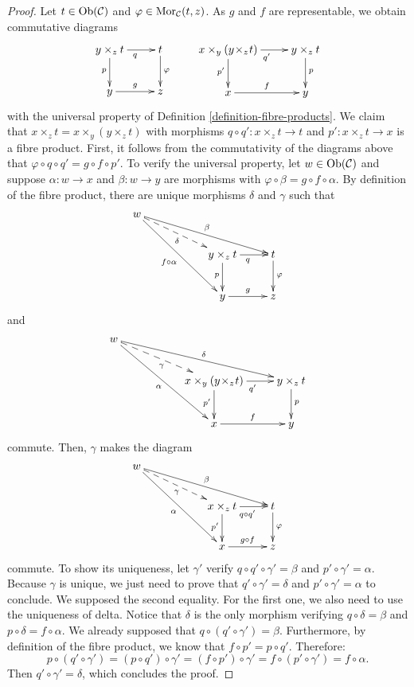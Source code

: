 \begin{proof}
Let $t \in \mathop{\mathrm{Ob}}\nolimits(\mathcal C)$ and $ \varphi \in \mathop{\mathrm{Mor}}\nolimits_{\mathcal C}(t,z) $.
As $g$ and $f$ are representable, we obtain commutative diagrams
$$
\xymatrix{
y \times_z t \ar[r]_q \ar[d]_p &
t \ar[d]^{\varphi} \\
y \ar[r]^{g} & z
}
\quad\quad
\xymatrix{
x \times_y (y\! \times_z\! t) \ar[r]_{q'} \ar[d]_{p'} &
y \times_z t \ar[d]^p \\
x \ar[r]^f & y
}
$$
with the universal property of Definition \ref{definition-fibre-products}.
We claim that $x \times_z t = x \times_y (y \times_z t)$
with morphisms $q \circ q' : x \times_z t \to t$ and $p' : x \times_z t \to x$
is a fibre product. First, it follows from the commutativity of the
diagrams above that $\varphi \circ q \circ q' = g \circ f \circ p'$.
To verify the universal property, let
$w \in \mathop{\mathrm{Ob}}\nolimits(\mathcal C)$ and suppose $\alpha : w \to x$ and
$\beta : w \to y$ are morphisms with
$\varphi \circ \beta = g \circ f \circ \alpha$.
By definition of the fibre product, there
are unique morphisms $\delta$ and $\gamma$ such that
$$
\xymatrix{
w \ar[rrrd]^\beta \ar@{-->}[rrd]_\delta \ar[rrdd]_{f\circ\alpha} & & \\
& & y \times_z t \ar[d]_p \ar[r]_q & t \ar[d]^{\varphi} \\
& & y \ar[r]^{g} & z
}
$$
and
$$
\xymatrix{
w \ar[rrrd]^\delta \ar@{-->}[rrd]_\gamma \ar[rrdd]_{\alpha} & & \\
& & x \times_y (y\!\times_z\! t) \ar[d]_{p'} \ar[r]_{q'} &
y \times_z t \ar[d]^{p} \\
& & x \ar[r]^{f} & y
}
$$
commute. Then, $\gamma$ makes the diagram
$$
\xymatrix{
w \ar[rrrd]^\beta \ar@{-->}[rrd]_\gamma \ar[rrdd]_{\alpha} & & \\
& & x \times_z t \ar[d]_{p'} \ar[r]_{q\circ q'} & t \ar[d]^{\varphi} \\
& & x \ar[r]^{g\circ f} & z
}
$$
commute. To show its uniqueness, let $\gamma'$ verify $ q\circ q'\circ\gamma' =
\beta $ and $ p'\circ \gamma' = \alpha $. Because $\gamma$ is unique, we just
need to prove that $ q'\circ\gamma' = \delta $ and $ p'\circ\gamma' = \alpha $
to conclude. We supposed the second equality. For the first one, we also need
to use the uniqueness of delta. Notice that $\delta$ is the only morphism
verifying $ q\circ\delta = \beta $ and $ p\circ\delta = f\circ\alpha $. We
already supposed that $ q\circ (q'\circ\gamma') = \beta $. Furthermore, by
definition of the fibre product, we know that $ f\circ p' = p\circ q' $.
Therefore:
$$
p\circ (q'\circ\gamma') =
(p\circ q')\circ\gamma' =
(f\circ p')\circ\gamma' =
f\circ (p'\circ\gamma') = f\circ\alpha.
$$
Then $ q'\circ\gamma' = \delta $, which concludes the proof.
\end{proof}

